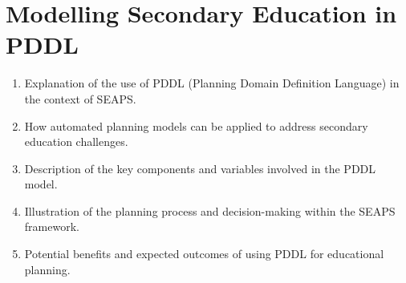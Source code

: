 \section{Modelling Secondary Education in PDDL}
\begin{enumerate}
    \item Explanation of the use of PDDL (Planning Domain Definition Language) in the context of SEAPS.
    \item How automated planning models can be applied to address secondary education challenges.
    \item Description of the key components and variables involved in the PDDL model.
    \item Illustration of the planning process and decision-making within the SEAPS framework.
    \item Potential benefits and expected outcomes of using PDDL for educational planning.
\end{enumerate}
